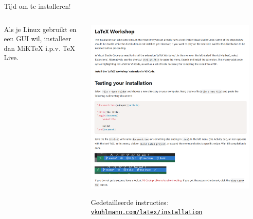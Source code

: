 \begin{frame}{Tijd om te installeren!}
\begin{columns}
\begin{column}{0.4\textwidth}
            Als je Linux gebruikt en een GUI wil, installeer dan MiKTeX i.p.v. TeX Live.


            
        \end{column}
        \begin{column}{0.6\textwidth}
            \tiny
            \includegraphics[width=\linewidth,height=0.8\textheight,keepaspectratio]{assets/installLaTeXWorkshop.png}

            {\tiny
            Gedetailleerde instructies:
            \href{https://vkuhlmann.com/latex/installation}{\nolinkurl{vkuhlmann.com/latex/installation}}}


            
        \end{column}
    \end{columns}
\end{frame}